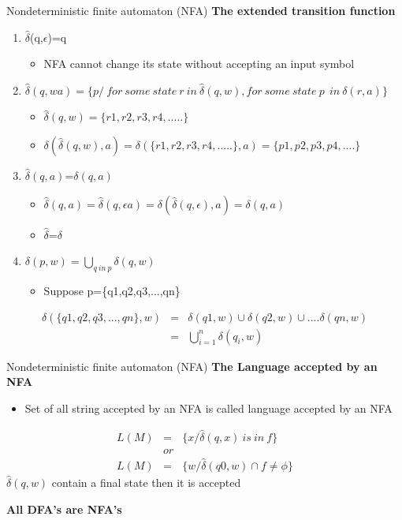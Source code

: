 \documentclass{beamer}
\begin{document}
\begin{frame}{Nondeterministic finite automaton (NFA)}
	\textbf{The extended transition function}
	\begin{enumerate}
		\item $\hat{\delta}$(q,$\epsilon$)=q
		\begin{itemize}
			\item NFA cannot change its state without accepting an input symbol
		\end{itemize}
	\item $\hat{\delta}(q,wa)=\{p/ \ for\  some\  state\ r \ in \ \hat{\delta}(q,w), for\  some\  state\  p\  \ in \ \delta(r,a)\}$
	\begin{itemize}
		\item $\hat{\delta}(q,w)=\{r1,r2,r3,r4,.....\}$
		\item $\delta(\hat{\delta}(q,w),a)=\delta(\{r1,r2,r3,r4,.....\},a)=\{p1,p2,p3,p4,....\}$
	\end{itemize}
\item $\hat{\delta}(q,a)$=$\delta(q,a)$
\begin{itemize}
	\item $\hat{\delta}(q,a)=\hat{\delta}(q,\epsilon a)=\delta(\hat{\delta}(q,\epsilon),a)=\delta(q,a)$
	\item $\hat{\delta}$=$\delta$
\end{itemize}
\item $\delta(p,w)=\bigcup\limits_{q\ in \ p}\delta(q,w)$
\begin{itemize}
	\item Suppose p=\{q1,q2,q3,...,qn\}
\end{itemize}
	\end{enumerate}
\small
\begin{eqnarray*}
	\delta(\{q1,q2,q3,...,qn\},w)&=&\delta(q1,w)\cup\delta(q2,w)\cup....\delta(qn,w)\\
								&=&\bigcup\limits_{i=1}^{n}\delta(q_i,w)
\end{eqnarray*}

\end{frame}
\begin{frame}{Nondeterministic finite automaton (NFA)}
	\textbf{The Language accepted by an NFA}
	\begin{itemize}
		\item Set of all string accepted by an NFA is called language accepted by an NFA
	\end{itemize}
\begin{eqnarray*}
	L(M)&=&\{x/\hat{\delta}(q,x) \ is \ in \ f\}\\
	&or&\\
	  L(M)&=&\{w/\hat{\delta}(q0,w)\cap f\neq \phi\}
\end{eqnarray*}
$\hat{\delta}(q,w)$ contain a final state then it is accepted
	\begin{center}
		\textbf{All DFA's are NFA's}
	\end{center}
\end{frame}
\end{document}
